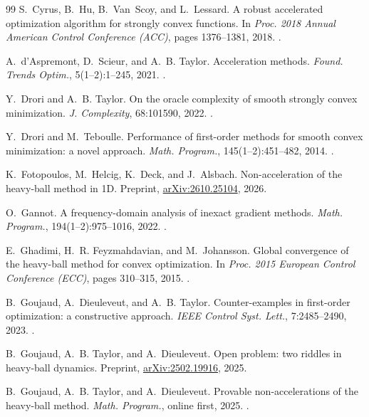 \documentclass[11pt]{article}
\theoremstyle{definition}
\theoremstyle{remark}
\begin{document}
\begin{thebibliography}{99}
 S.~Cyrus, B.~Hu, B.~Van~Scoy, and L.~Lessard. A robust accelerated optimization algorithm for strongly convex functions. In \textit{Proc. 2018 Annual American Control Conference (ACC)}, pages 1376--1381, 2018. .

 A.~d'Aspremont, D.~Scieur, and A.~B. Taylor. Acceleration methods. \textit{Found. Trends Optim.}, 5(1--2):1--245, 2021. .

 Y.~Drori and A.~B. Taylor. On the oracle complexity of smooth strongly convex minimization. \textit{J. Complexity}, 68:101590, 2022. .

 Y.~Drori and M.~Teboulle. Performance of first-order methods for smooth convex minimization: a novel approach. \textit{Math. Program.}, 145(1--2):451--482, 2014. .

 K.~Fotopoulos, M.~Helcig, K.~Deck, and J.~Alsbach. Non-acceleration of the heavy-ball method in 1D. Preprint, \href{https://arxiv.org/abs/2610.25104}{arXiv:2610.25104}, 2026.

 O.~Gannot. A frequency-domain analysis of inexact gradient methods. \textit{Math. Program.}, 194(1--2):975--1016, 2022. .

 E.~Ghadimi, H.~R. Feyzmahdavian, and M.~Johansson. Global convergence of the heavy-ball method for convex optimization. In \textit{Proc. 2015 European Control Conference (ECC)}, pages 310--315, 2015. .

 B.~Goujaud, A.~Dieuleveut, and A.~B. Taylor. Counter-examples in first-order optimization: a constructive approach. \textit{IEEE Control Syst. Lett.}, 7:2485--2490, 2023. .

 B.~Goujaud, A.~B. Taylor, and A.~Dieuleveut. Open problem: two riddles in heavy-ball dynamics. Preprint, \href{https://arxiv.org/abs/2502.19916}{arXiv:2502.19916}, 2025{}.

 B.~Goujaud, A.~B. Taylor, and A.~Dieuleveut. Provable non-accelerations of the heavy-ball method. \textit{Math. Program.}, online first, 2025{}. .


\end{thebibliography}
\end{document}
